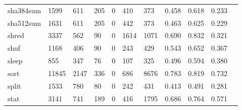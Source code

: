 \begin{longtable}{lp{1.10cm}p{1.10cm}p{1.10cm}p{1.10cm}p{1.10cm}p{1.10cm}p{1.10cm}p{1.10cm}p{1.10cm}p{1.10cm}}
sha384sum &                   1599 &                                611 &                               205 &                                0 &                               410 &                             373 &                             0.458 &                                 0.618 &                               0.233 \\
sha512sum &                   1631 &                                611 &                               205 &                                0 &                               442 &                             373 &                             0.463 &                                 0.625 &                               0.229 \\
shred     &                   3337 &                                562 &                                90 &                                0 &                              1614 &                            1071 &                             0.690 &                                 0.832 &                               0.321 \\
shuf      &                   1168 &                                406 &                                90 &                                0 &                               243 &                             429 &                             0.543 &                                 0.652 &                               0.367 \\
sleep     &                    855 &                                347 &                                76 &                                0 &                               107 &                             325 &                             0.496 &                                 0.594 &                               0.380 \\
sort      &                  11845 &                               2147 &                               336 &                                0 &                               686 &                            8676 &                             0.783 &                                 0.819 &                               0.732 \\
split     &                   1533 &                                780 &                                80 &                                0 &                               242 &                             431 &                             0.413 &                                 0.491 &                               0.281 \\
stat      &                   3141 &                                741 &                               189 &                                0 &                               416 &                            1795 &                             0.686 &                                 0.764 &                               0.571 \\

\end{longtable}
